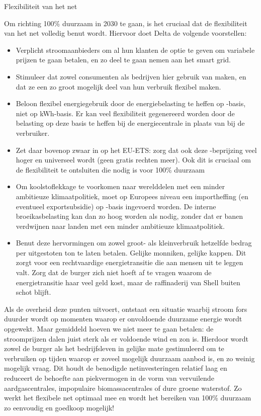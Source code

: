 \begin{voorstel}{Flexibiliteit van het net}
\begin{overwegingen}
\end{overwegingen}

\begin{aanbevelingen}
Om richting 100\% duurzaam in 2030 te gaan, is het cruciaal dat de flexibiliteit van het net volledig benut wordt. Hiervoor doet Delta de volgende voorstellen:
\begin{itemize}
	\item Verplicht stroomaanbieders om al hun klanten de optie te geven om variabele prijzen te gaan betalen, en zo deel te gaan nemen aan het smart grid.
	\item Stimuleer dat zowel consumenten als bedrijven hier gebruik van maken, en dat ze een zo groot mogelijk deel van hun verbruik flexibel maken.
	\item Beloon flexibel energiegebruik door de energiebelasting te heffen op \COO-basis, niet op kWh-basis. Er kan veel flexibiliteit gegenereerd worden door de belasting op deze basis te heffen bij de energiecentrale in plaats van bij de verbruiker.
	\item Zet daar bovenop zwaar in op het EU-ETS: zorg dat ook deze  \COO-beprijzing veel hoger en universeel wordt (geen gratis rechten meer). Ook dit is cruciaal om de flexibiliteit te ontsluiten die nodig is voor 100\% duurzaam
	\item Om koolstoflekkage te voorkomen naar werelddelen met een minder ambitieuze klimaatpolitiek, moet op Europees niveau een importheffing (en eventueel exportsubsidie) op \COO-basis ingevoerd worden. De interne broeikasbelasting kan dan zo hoog worden als nodig, zonder dat er banen verdwijnen naar landen met een minder ambitieuze klimaatpolitiek. 
	\item Benut deze hervormingen om zowel groot- als kleinverbruik hetzelfde bedrag per uitgestoten ton \COO te laten betalen. Gelijke monniken, gelijke kappen. Dit zorgt voor een rechtvaardige energietransitie die aan mensen uit te leggen valt. Zorg dat de burger zich niet hoeft af te vragen waarom de energietransitie haar veel geld kost, maar de raffinaderij van Shell buiten schot blijft.
\end{itemize}

Als de overheid deze punten uitvoert, ontstaat een situatie waarbij stroom fors duurder wordt op momenten waarop er onvoldoende duurzame energie wordt opgewekt. Maar gemiddeld hoeven we niet meer te gaan betalen: de stroomprijzen dalen juist sterk als er voldoende wind en zon is. Hierdoor wordt zowel de burger als het bedrijfsleven in gelijke mate gestimuleerd om te verbruiken op tijden waarop er zoveel mogelijk duurzaam aanbod is, en zo weinig mogelijk vraag. Dit houdt de benodigde netinvesteringen relatief laag en reduceert de behoefte aan piekvermogen in de vorm van vervuilende aardgascentrales, impopulaire biomassacentrales of dure groene waterstof. Zo werkt het flexibele net optimaal mee en wordt het bereiken van 100\% duurzaam zo eenvoudig en goedkoop mogelijk!
\end{aanbevelingen}

\end{voorstel}
